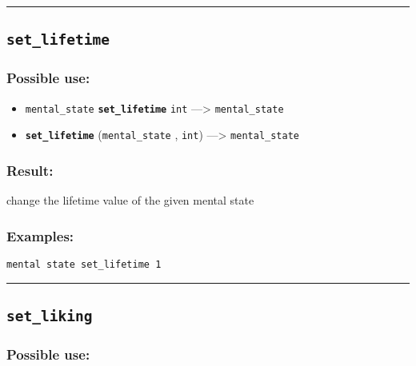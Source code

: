 \documentclass[]{book}
\providecommand{\tightlist}{%
  \setlength{\itemsep}{0pt}\setlength{\parskip}{0pt}}
\theoremstyle{definition}
\theoremstyle{definition}
\theoremstyle{definition}
\theoremstyle{remark}
\begin{document}
\begin{center}\rule{0.5\linewidth}{\linethickness}\end{center}

\subsection{\texorpdfstring{\texttt{set\_lifetime}}{set\_lifetime}}\label{set_lifetime}

\subsubsection{Possible use:}\label{possible-use-461}

\begin{itemize}
\tightlist
\item
  \texttt{mental\_state} \textbf{\texttt{set\_lifetime}} \texttt{int}
  ---\textgreater{} \texttt{mental\_state}
\item
  \textbf{\texttt{set\_lifetime}} (\texttt{mental\_state} ,
  \texttt{int}) ---\textgreater{} \texttt{mental\_state}
\end{itemize}

\subsubsection{Result:}\label{result-445}

change the lifetime value of the given mental state

\subsubsection{Examples:}\label{examples-318}

\begin{verbatim}
mental state set_lifetime 1 
\end{verbatim}

\begin{center}\rule{0.5\linewidth}{\linethickness}\end{center}

\subsection{\texorpdfstring{\texttt{set\_liking}}{set\_liking}}\label{set_liking}

\subsubsection{Possible use:}\label{possible-use-462}
\end{document}
